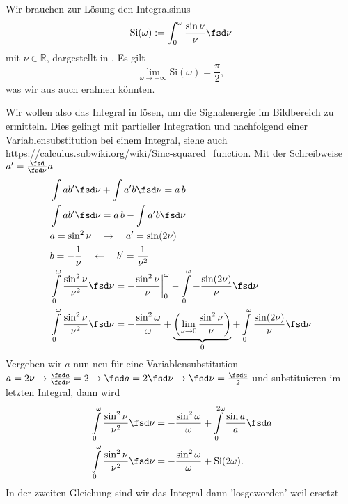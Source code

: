 \begin{ExCalc}
Wir brauchen zur Lösung den Integralsinus
\begin{equation}
  \mathrm{Si}(\omega) := \int_{0}^{\omega} \frac{\sin \nu}{\nu} \fsd \nu
\end{equation}
mit $\nu\in\mathbb{R}$, dargestellt in .
Es gilt
\begin{equation}
  \lim_{\omega\to+\infty} \mathrm{Si}(\omega) = \frac{\pi}{2},
\end{equation}
was wir aus  auch erahnen könnten.

Wir wollen also das Integral in  lösen,
um die Signalenergie im Bildbereich zu ermitteln.
%
Dies gelingt mit partieller Integration und nachfolgend einer Variablensubstitution
bei einem Integral, siehe auch \url{https://calculus.subwiki.org/wiki/Sinc-squared_function}.
Mit der Schreibweise $a' = \frac{\fsd}{\fsd \nu} a$
\begin{align}
&\int a b' \fsd \nu + \int a' b \fsd \nu = a\,b\\
&\int a b' \fsd \nu = a\,b - \int a' b \fsd \nu\\
&a = \sin^2 \nu \quad\rightarrow\quad a'=\sin(2 \nu)\\ %
&b=-\frac{1}{\nu} \quad\leftarrow\quad b'=\frac{1}{\nu^2}\\
&\int\limits_0^\omega \frac{\sin^2 \nu}{\nu^2} \fsd \nu  =
-\frac{\sin^2 \nu}{\nu}\bigg|_0^\omega
- \int\limits_0^\omega -\frac{\sin(2 \nu)}{\nu} \fsd \nu\\
&\int\limits_0^\omega \frac{\sin^2 \nu}{\nu^2} \fsd \nu  =
-\frac{\sin^2 \omega}{\omega}
+\underbrace{\left(\lim_{\nu\to 0}\frac{\sin^2 \nu}{\nu}\right)}_{0}
+ \int\limits_0^\omega \frac{\sin(2 \nu)}{\nu} \fsd \nu
\end{align}
%
Vergeben wir $a$ nun neu für eine Variablensubstitution
$a = 2 \nu\rightarrow\frac{\fsd a}{\fsd \nu} = 2\rightarrow\fsd a = 2 \fsd \nu\rightarrow\fsd \nu = \frac{\fsd a}{2}$
und substituieren im letzten Integral, dann wird
\begin{align}
&\int\limits_0^\omega \frac{\sin^2 \nu}{\nu^2} \fsd \nu  =
-\frac{\sin^2 \omega}{\omega} + \int\limits_0^{2 \omega} \frac{\sin a}{a} \fsd a \\
&\int\limits_0^\omega \frac{\sin^2 \nu}{\nu^2} \fsd \nu  =
- \frac{\sin^2 \omega}{\omega} + \mathrm{Si}(2 \omega).
\end{align}
In der zweiten Gleichung sind wir das Integral dann 'losgeworden' weil ersetzt

\end{ExCalc}
